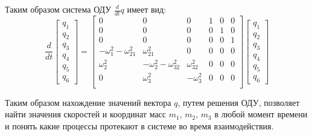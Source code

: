 Таким образом система ОДУ $\frac{d}{dt}q$ имеет вид:
\begin{equation}
	\frac{d}{dt}
	\begin{bmatrix} q_1 \\ q_2 \\ q_3 \\ q_4 \\ q_5 \\ q_6 \end{bmatrix}
	=
	\begin{bmatrix}
		0 & 0 & 0 & 1 & 0 & 0 \\
		0 & 0 & 0 & 0 & 1 & 0 \\
		0 & 0 & 0 & 0 & 0 & 1 \\
		-\omega_1^2 - \omega_{21}^2 & \omega_{21}^2 & 0 & 0 & 0 & 0 \\
		\omega_2^2 & -\omega_{2}^2 - \omega_{32}^2 & \omega_{32}^2 & 0 & 0 & 0 \\
		0 & \omega_{3}^2 & -\omega_{3}^2 & 0 & 0 & 0 \\
	\end{bmatrix}
	\begin{bmatrix} q_1 \\ q_2 \\ q_3 \\ q_4 \\ q_5 \\ q_6 \end{bmatrix}
	\label{eq:syst}
\end{equation}

Таким образом нахождение значений вектора $q$, путем решения ОДУ, позволяет найти значения скоростей и координат масс $m_1$, $m_2$, $m_3$ в любой момент времени и понять какие процессы протекают в системе во время взаимодействия.  